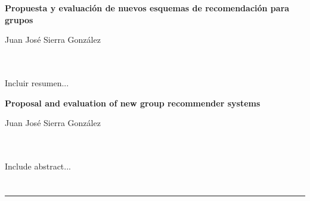 \chapter*{}






\cleardoublepage
\thispagestyle{empty}

\begin{center}
{\large\bfseries Propuesta y evaluación de nuevos esquemas de recomendación para grupos}\\
\end{center}
\begin{center}
Juan José Sierra González\\
\end{center}

\\

\vspace{0.7cm}
\\

Incluir resumen...
\cleardoublepage


\thispagestyle{empty}


\begin{center}
{\large\bfseries Proposal and evaluation of new group recommender systems}\\
\end{center}
\begin{center}
Juan José Sierra González\\
\end{center}

\\

\vspace{0.7cm}
\\

Include abstract...

\chapter*{}
\thispagestyle{empty}

\noindent\rule[-1ex]{\textwidth}{2pt}\\[4.5ex]

